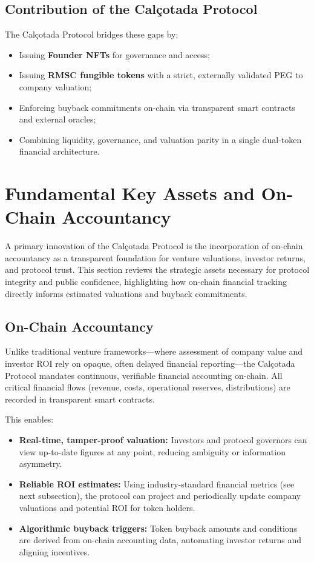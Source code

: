 \documentclass[conference]{IEEEtran}
\begin{document}
\subsection{Contribution of the Calçotada Protocol}

The Calçotada Protocol bridges these gaps by:

\begin{itemize}
    \item Issuing \textbf{Founder NFTs} for governance and access;
    \item Issuing \textbf{RMSC fungible tokens} with a strict, externally validated PEG to company valuation;
    \item Enforcing buyback commitments on-chain via transparent smart contracts and external oracles;
    \item Combining liquidity, governance, and valuation parity in a single dual-token financial architecture.
\end{itemize}



\section{Fundamental Key Assets and On-Chain Accountancy}
A primary innovation of the Calçotada Protocol is the incorporation of on-chain accountancy as a transparent foundation for venture valuations, investor returns, and protocol trust. This section reviews the strategic assets necessary for protocol integrity and public confidence, highlighting how on-chain financial tracking directly informs estimated valuations and buyback commitments.

\subsection{On-Chain Accountancy}
Unlike traditional venture frameworks—where assessment of company value and investor ROI rely on opaque, often delayed financial reporting—the Calçotada Protocol mandates continuous, verifiable financial accounting on-chain. All critical financial flows (revenue, costs, operational reserves, distributions) are recorded in transparent smart contracts.

This enables:
\begin{itemize}
    \item \textbf{Real-time, tamper-proof valuation:} Investors and protocol governors can view up-to-date figures at any point, reducing ambiguity or information asymmetry.
    \item \textbf{Reliable ROI estimates:} Using industry-standard financial metrics (see next subsection), the protocol can project and periodically update company valuations and potential ROI for token holders.
    \item \textbf{Algorithmic buyback triggers:} Token buyback amounts and conditions are derived from on-chain accounting data, automating investor returns and aligning incentives.
\end{itemize}
\end{document}
